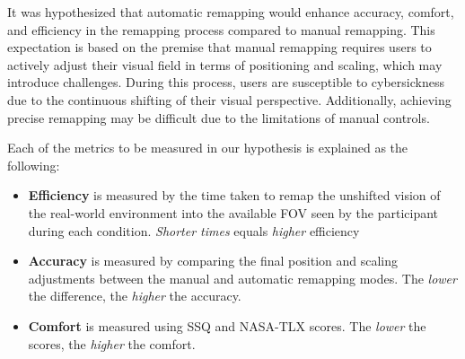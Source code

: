 \documentclass{l4proj}
\begin{document}
It was hypothesized that automatic remapping would enhance accuracy, comfort, and efficiency in the remapping process compared to manual remapping. This expectation is based on the premise that manual remapping requires users to actively adjust their visual field in terms of positioning and scaling, which may introduce challenges. During this process, users are susceptible to cybersickness due to the continuous shifting of their visual perspective. Additionally, achieving precise remapping may be difficult due to the limitations of manual controls. \newline


Each of the metrics to be measured in our hypothesis is explained as the following:
\begin{itemize}
    \item \textbf{Efficiency} is measured by the time taken to remap the unshifted vision of the real-world environment into the available FOV seen by the participant during each condition. \textit{Shorter times} equals \textit{higher} efficiency
    \item \textbf{Accuracy} is measured by comparing the final position and scaling adjustments between the manual and automatic remapping modes. The \textit{lower} the difference, the \textit{higher} the accuracy.
    \item \textbf{Comfort} is measured using SSQ and NASA-TLX scores. The \textit{lower} the scores, the \textit{higher} the comfort.
\end{itemize}


\end{document}
